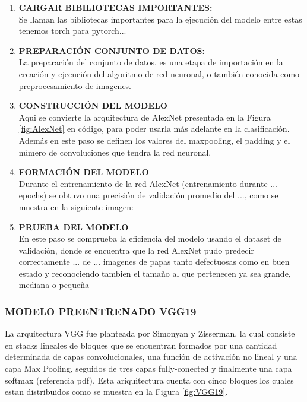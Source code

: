 				\begin{enumerate}
					\item \textbf{CARGAR BIBILIOTECAS IMPORTANTES:} 
					\\
					Se llaman las bibliotecas importantes para la ejecución del modelo entre estas tenemos torch para pytorch...
					\item \textbf{PREPARACIÓN CONJUNTO DE DATOS:} 
					\\
					La preparación del conjunto de datos, es una etapa de importación en la creación y ejecución del algoritmo de red neuronal, o también conocida como preprocesamiento de imagenes.
					\item\textbf{CONSTRUCCIÓN DEL MODELO}
					\\
					Aqui se convierte la arquitectura de AlexNet presentada en la Figura \ref{fig:AlexNet} en código, para poder usarla más adelante en la clasificación.
					Además en este paso se definen los valores del maxpooling, el padding y el número de convoluciones que tendra la red neuronal.
					\item\textbf{FORMACIÓN DEL MODELO}
					\\
					Durante el entrenamiento de la red AlexNet (entrenamiento durante ... epochs) se obtuvo una precisión de validación promedio del ..., como se muestra en la siguiente imagen:
					\item \textbf{PRUEBA DEL MODELO}
					\\
					En este paso se comprueba la eficiencia del modelo usando el dataset de validación, donde se encuentra que la red AlexNet pudo predecir correctamente ... de ... imagenes de papas tanto defectuosas como en buen estado y reconociendo tambien el tamaño al que pertenecen ya sea grande, mediana o pequeña 
				\end{enumerate} 


			\subsubsection{\MakeUppercase{Modelo preentrenado VGG19}}
			
				La arquitectura VGG fue planteada por Simonyan y Zisserman, la cual consiste en stacks lineales de bloques que se encuentran formados por una cantidad determinada de capas convolucionales, una función de activación no lineal y una capa Max Pooling, seguidos de tres capas fully-conected y finalmente una capa softmax (referencia pdf). Esta ariquitectura cuenta con cinco bloques los cuales estan distribuidos como se muestra en la Figura \ref{fig:VGG19}.
				
